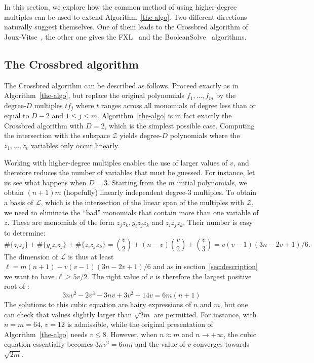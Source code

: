 \documentclass[a4paper,UKenglish,cleveref, autoref]{lipics-v2019}
\begin{document}
In this section, we explore how the common method of using higher-degree
multiples can be used to extend Algorithm~\ref{the-algo}. Two different
directions naturally suggest themselves. One of them leads to the
\textsf{Crossbred} algorithm of Joux-Vitse~\cite{JouxV17}, the other one gives
the \textsf{FXL}~\cite{CourtoisKPS00} and the
\textsf{BooleanSolve}~\cite{BardetFSS13} algorithms.

\subsection{The \textsf{Crossbred} algorithm}
\label{sec:JV}

The \textsf{Crossbred} algorithm can be described as follows. Proceed exactly as
in Algorithm~\ref{the-algo}, but replace the original polynomials
$f_1, \dots, f_m$ by the degree-$D$ multiples $t f_j$ where $t$ ranges across
all monomials of degree less than or equal to $D-2$ and $1 \leq j \leq
m$. Algorithm~\ref{the-algo} is in fact exactly the \textsf{Crossbred} algorithm
with $D=2$, which is the simplest possible case. Computing the intersection with
the subspace $\mathcal{Z}$ yields degree-$D$ polynomials where the
$z_1, \dots, z_v$ variables only occur linearly.

Working with higher-degree multiples enables the use of larger values of $v$,
and therefore reduces the number of variables that must be guessed. For
instance, let us see what happens when $D=3$. Starting from the $m$ initial
polynomials, we obtain $(n+1)m$ (hopefully) linearly independent degree-3
multiples. To obtain a basis of $\mathcal{L}$, which is the intersection of the
linear span of the multiples with $\mathcal{Z}$, we need to eliminate the
``bad'' monomials that contain more than one variable of $z$. These are
monomials of the form $z_jz_k, y_iz_jz_k$ and $z_iz_jz_k$. Their number is easy
to determine:
\[
  \#\{z_iz_j\} + \#\{y_iz_iz_j\} +\#\{z_iz_jz_k\} = \binom{v}{2} + (n-v)\binom{v}{2} +\binom{v}{3} = v(v - 1)(3n - 2v + 1) / 6.
\]
The dimension of $\mathcal{L}$ is thus at least
$\ell = m(n+1) - v(v - 1)(3n - 2v + 1) / 6$ and as in
section~\ref{sec:description} we want to have $\ell \geq 5v/2$. The right value
of $v$ is therefore the largest positive root of  :
\[
3nv^2 - 2v^3 - 3nv + 3v^2 + 14v = 6m(n+1)
\]
The solutions to this cubic equation are hairy expressions of $n$ and $m$, but
one can check that values slightly larger than $\sqrt{2m}$ are permitted. For
instance, with $n=m=64$, $v=12$ is admissible, while the original presentation
of Algorithm~\ref{the-algo} needs $v \leq 8$. However, when $n \approx m$ and
$n \rightarrow +\infty$, the cubic equation essentially becomes $3nv^2 = 6mn$
and the value of $v$ converges towards $\sqrt{2m}$.
\end{document}
